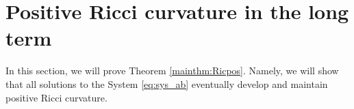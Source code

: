\documentclass{amsart}
\numberwithin{equation}{section}
\theoremstyle{plain}
\theoremstyle{definition}
\theoremstyle{remark}
\numberwithin{table}{section}
\begin{document}
\section{Positive Ricci curvature in the long term}
\label{sec:mainproof}


    

    In this section, we will prove Theorem \ref{mainthm:Ricpos}.
    Namely, we will show that all solutions to the System \eqref{eq:sys_ab} eventually develop and maintain positive Ricci curvature.
\end{document}
